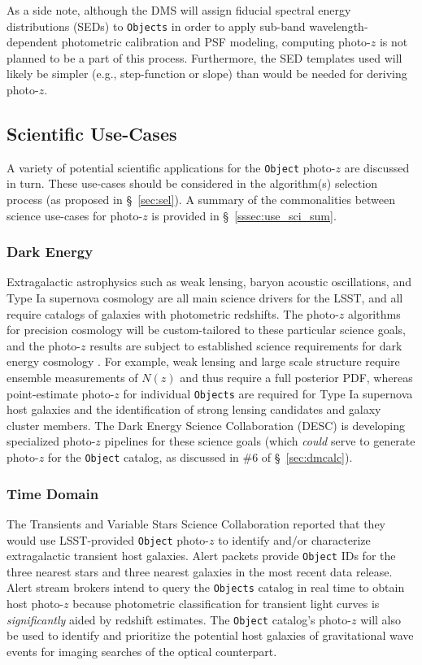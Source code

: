 \documentclass[DM,lsstdraft,toc]{lsstdoc}
\begin{document}
As a side note, although the DMS will assign fiducial spectral energy distributions (SEDs) to {\tt Objects} in order to apply sub-band wavelength-dependent photometric calibration and PSF modeling, computing photo-$z$ is not planned to be a part of this process.
Furthermore, the SED templates used will likely be simpler (e.g., step-function or slope) than would be needed for deriving photo-$z$.

\subsection{Scientific Use-Cases}\label{ssec:use_sci}

A variety of potential scientific applications for the {\tt Object} photo-$z$ are discussed in turn. 
These use-cases should be considered in the algorithm(s) selection process (as proposed in \S~\ref{sec:sel}).
A summary of the commonalities between science use-cases for photo-$z$ is provided in \S~\ref{sssec:use_sci_sum}.

\subsubsection{Dark Energy}
Extragalactic astrophysics such as weak lensing, baryon acoustic oscillations, and Type Ia supernova cosmology are all main science drivers for the LSST, and all require catalogs of galaxies with photometric redshifts.
The photo-$z$ algorithms for precision cosmology will be custom-tailored to these particular science goals, and the photo-$z$ results are subject to established science requirements for dark energy cosmology \citep{2018arXiv180901669T}.
For example, weak lensing and large scale structure require ensemble measurements of $N(z)$ and thus require a full posterior PDF, whereas point-estimate photo-$z$ for individual {\tt Objects} are required for Type Ia supernova host galaxies and the identification of strong lensing candidates and galaxy cluster members. 
The Dark Energy Science Collaboration (DESC) is developing specialized photo-$z$ pipelines for these science goals (which {\it could} serve to generate photo-$z$ for the {\tt Object} catalog, as discussed in \#6 of \S~\ref{sec:dmcalc}).

\subsubsection{Time Domain}
The Transients and Variable Stars Science Collaboration reported that they would use LSST-provided {\tt Object} photo-$z$ to identify and/or characterize extragalactic transient host galaxies.
Alert packets provide {\tt Object} IDs for the three nearest stars and three nearest galaxies in the most recent data release.
Alert stream brokers intend to query the {\tt Objects} catalog in real time to obtain host photo-$z$ because photometric classification for transient light curves is {\it significantly} aided by redshift estimates.
The {\tt Object} catalog's photo-$z$ will also be used to identify and prioritize the potential host galaxies of gravitational wave events for imaging searches of the optical counterpart.
\end{document}
